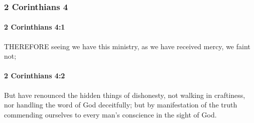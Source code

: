 	\subsubsection{2 Corinthians 4} %
		\label{2CORINTHIANS-4}
		
		\paragraph{2 Corinthians 4:1} %
			\label{2CORINTHIANS-4-1}

			THEREFORE seeing we have this ministry, as we have received mercy, we faint not;

			\begin{framed}
			\scriptsize
				\begin{compactdesc}
					\item[SBLG] 
				\end{compactdesc}
			\end{framed}

		\paragraph{2 Corinthians 4:2} %
			\label{2CORINTHIANS-4-2}

			But have renounced the hidden things of dishonesty, not walking in craftiness, nor handling the word of God deceitfully; but by manifestation of the truth commending ourselves to every man's conscience in the sight of God.

